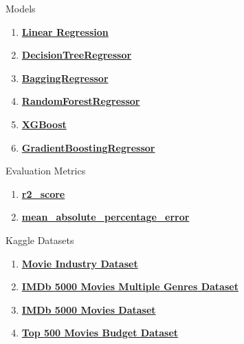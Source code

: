 \documentclass[conference]{IEEEtran}
\begin{document}
\begin{thebibliography}{1}
     Models
    \begin{enumerate}
        \item \href{https://scikit-learn.org/stable/modules/generated/sklearn.linear_model.LinearRegression.html}{\textbf{Linear Regression}}
        \item \href{https://scikit-learn.org/stable/modules/generated/sklearn.tree.DecisionTreeRegressor.html}{\textbf{DecisionTreeRegressor}}
        \item \href{https://scikit-learn.org/stable/modules/generated/sklearn.ensemble.BaggingRegressor.html}{\textbf{BaggingRegressor}}
        \item \href{https://scikit-learn.org/stable/modules/generated/sklearn.ensemble.RandomForestRegressor.html}{\textbf{RandomForestRegressor}}
        \item \href{https://xgboost.readthedocs.io/}{\textbf{XGBoost}}
        \item \href{https://scikit-learn.org/stable/modules/generated/sklearn.ensemble.GradientBoostingRegressor.html}{\textbf{GradientBoostingRegressor}}
    \end{enumerate}
    
     Evaluation Metrics
    \begin{enumerate}
        \item \href{https://scikit-learn.org/stable/modules/generated/sklearn.metrics.r2_score.html}{\textbf{r2\_score}}
        \item \href{https://stephenallwright.com/interpret-mape/}{\textbf{mean\_absolute\_percentage\_error}}
    \end{enumerate}

     Kaggle Datasets
    \begin{enumerate}
        \item \href{https://www.kaggle.com/datasets/danielgrijalvas/movies}{\textbf{Movie Industry Dataset}}
        \item \href{https://www.kaggle.com/datasets/rakkesharv/imdb-5000-movies-multiple-genres-dataset}{\textbf{IMDb 5000 Movies Multiple Genres Dataset}}
        \item \href{https://www.kaggle.com/datasets/carolzhangdc/imdb-5000-movie-dataset}{\textbf{IMDb 5000 Movies Dataset}}
        \item \href{https://www.kaggle.com/datasets/mitchellharrison/top-500-movies-budget}{\textbf{Top 500 Movies Budget Dataset}}
    \end{enumerate}
\end{thebibliography}
\end{document}
